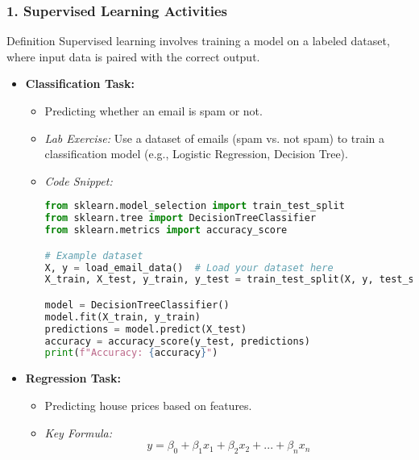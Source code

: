 \documentclass[aspectratio=169]{beamer}
\begin{document}
\begin{frame}[fragile]
    \frametitle{1. Supervised Learning Activities}
    \begin{block}{Definition}
        Supervised learning involves training a model on a labeled dataset, where input data is paired with the correct output.
    \end{block}
    \begin{itemize}
        \item \textbf{Classification Task:}
            \begin{itemize}
                \item Predicting whether an email is spam or not.
                \item \textit{Lab Exercise:} Use a dataset of emails (spam vs. not spam) to train a classification model (e.g., Logistic Regression, Decision Tree).
                \item \textit{Code Snippet:}
                \begin{lstlisting}[language=Python]
from sklearn.model_selection import train_test_split
from sklearn.tree import DecisionTreeClassifier
from sklearn.metrics import accuracy_score

# Example dataset
X, y = load_email_data()  # Load your dataset here
X_train, X_test, y_train, y_test = train_test_split(X, y, test_size=0.2)

model = DecisionTreeClassifier()
model.fit(X_train, y_train)
predictions = model.predict(X_test)
accuracy = accuracy_score(y_test, predictions)
print(f"Accuracy: {accuracy}")
                \end{lstlisting}
            \end{itemize}
        \item \textbf{Regression Task:}
            \begin{itemize}
                \item Predicting house prices based on features.
                \item \textit{Key Formula:} \[
                y = \beta_0 + \beta_1 x_1 + \beta_2 x_2 + ... + \beta_n x_n
                \]
            \end{itemize}
    \end{itemize}
\end{frame}
\end{document}
